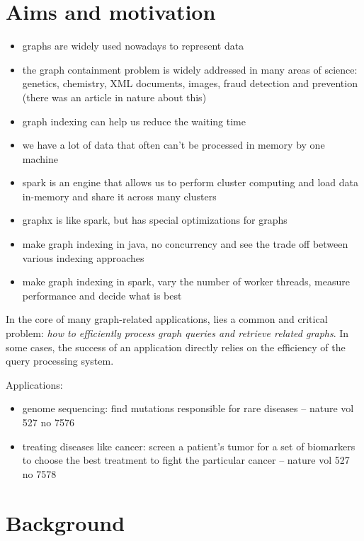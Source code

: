 \documentclass{l4proj}
\theoremstyle{definition}
\begin{document}
    \section{Aims and motivation}
        \begin{itemize}
            \item graphs are widely used nowadays to represent data
            \item the graph containment problem is widely addressed in many areas of science: genetics, chemistry, XML documents, images, fraud detection and prevention (there was an article in nature about this)
            \item graph indexing can help us reduce the waiting time
            \item we have a lot of data that often can't be processed in memory by one machine
            \item spark is an engine that allows us to perform cluster computing and load data in-memory and share it across many clusters
            \item graphx is like spark, but has special optimizations for graphs
            \item make graph indexing in java, no concurrency and see the trade off between various indexing approaches
            \item make graph indexing in spark, vary the number of worker threads, measure performance and decide what is best
        \end{itemize}
        
        In the core of many graph-related applications, lies a common and critical problem: \textit{how to efficiently process graph queries and retrieve related graphs}. In some cases, the success of an application directly relies on the efficiency of the query processing system.  
        
        Applications:
        \begin{itemize}
        \item genome sequencing: find mutations responsible for rare diseases -- nature vol 527 no 7576
        \item treating diseases like cancer: screen a patient's tumor for a set of biomarkers to choose the best treatment to fight the particular cancer -- nature vol 527 no 7578
        \end{itemize}
\section{Background}
        
\end{document}
